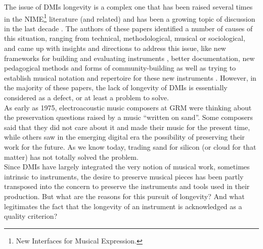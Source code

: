The issue of DMIs longevity is a complex one that has been raised several times in the NIME\footnote{New Interfaces for Musical Expression.} literature (and related) and has been a growing topic of discussion in the last decade \cite{baguyos_contemporary_2014}\cite{morreale_design_2017}. The authors of these papers identified a number of causes of this situation, ranging from technical, methodological, musical or sociological, and came up with insights and directions to address this issue, like new frameworks for building and evaluating instruments  \cite{jorda_digital_2004} \cite{morreale_design_2017}, better documentation, new pedagogical methods and forms of community-building as well as trying to establish musical notation and repertoire for these new instruments \cite{mamedes_composing_2014}\cite{mays_notation_2014}. However, in the majority of these papers, the lack of longevity of DMIs is essentially considered as a defect, or at least a problem to solve.\\
\indent As early as 1975, electroacoustic music composers at \gls{GRM} were thinking about the preservation questions raised by a music “written on sand”. Some composers said that they did not care about it and made their music for the present time, while others saw in the emerging digital era the possibility of preserving their work for the future. As we know today, trading sand for silicon (or cloud for that matter) has not totally solved the problem.\\
\indent Since DMIs have largely integrated the very notion of musical work, sometimes intrinsic to instruments, the desire to preserve musical pieces has been partly transposed into the concern to preserve the instruments and tools used in their production. But what are the reasons for this pursuit of longevity? And what legitimates the fact that the longevity of an instrument is acknowledged as a quality criterion? 

